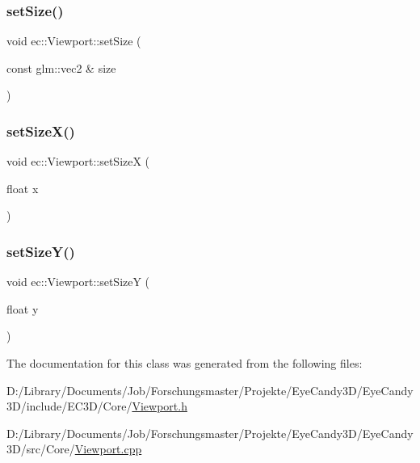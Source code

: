 \mbox{\label{classec_1_1_viewport_ad8e05ac01f4c19c599f6b7dc344b815c}} 
\subsubsection{\texorpdfstring{set\+Size()}{setSize()}\hspace{0.1cm}{\footnotesize\ttfamily [2/2]}}
{\footnotesize\ttfamily void ec\+::\+Viewport\+::set\+Size (\begin{DoxyParamCaption}\item[{const glm\+::vec2 \&}]{size }\end{DoxyParamCaption})}

\mbox{\label{classec_1_1_viewport_af1bcf1e3a8a06458c41a0c646b5f2057}} 
\subsubsection{\texorpdfstring{set\+Size\+X()}{setSizeX()}}
{\footnotesize\ttfamily void ec\+::\+Viewport\+::set\+SizeX (\begin{DoxyParamCaption}\item[{float}]{x }\end{DoxyParamCaption})}

\mbox{\label{classec_1_1_viewport_ae9420c066d2bf6f1a6cc5c0b65092862}} 
\subsubsection{\texorpdfstring{set\+Size\+Y()}{setSizeY()}}
{\footnotesize\ttfamily void ec\+::\+Viewport\+::set\+SizeY (\begin{DoxyParamCaption}\item[{float}]{y }\end{DoxyParamCaption})}



The documentation for this class was generated from the following files\+:\begin{DoxyCompactItemize}
\item 
D\+:/\+Library/\+Documents/\+Job/\+Forschungsmaster/\+Projekte/\+Eye\+Candy3\+D/\+Eye\+Candy3\+D/include/\+E\+C3\+D/\+Core/\mbox{\hyperlink{_viewport_8h}{Viewport.\+h}}\item 
D\+:/\+Library/\+Documents/\+Job/\+Forschungsmaster/\+Projekte/\+Eye\+Candy3\+D/\+Eye\+Candy3\+D/src/\+Core/\mbox{\hyperlink{_viewport_8cpp}{Viewport.\+cpp}}\end{DoxyCompactItemize}
